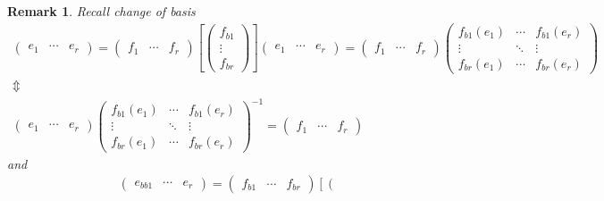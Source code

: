 \documentclass[aps,preprint]{revtex4}
\newtheorem{remark}[theorem]{Remark}
\begin{document}
\begin{remark}
Recall change of basis 
\begin{gather}
\left( 
\begin{array}{ccc}
e_{1} & \cdots & e_{r}%
\end{array}%
\right) =\left( 
\begin{array}{ccc}
f_{1} & \cdots & f_{r}%
\end{array}%
\right) \left[ \left( 
\begin{array}{c}
f_{b1} \\ 
\vdots \\ 
f_{br}%
\end{array}%
\right) \right] \left( 
\begin{array}{ccc}
e_{1} & \cdots & e_{r}%
\end{array}%
\right) =\left( 
\begin{array}{ccc}
f_{1} & \cdots & f_{r}%
\end{array}%
\right) \left( 
\begin{array}{ccc}
f_{b1}\left( e_{1}\right) & \cdots & f_{b1}\left( e_{r}\right) \\ 
\vdots & \ddots & \vdots \\ 
f_{br}\left( e_{1}\right) & \cdots & f_{br}\left( e_{r}\right)%
\end{array}%
\right) \\
\Updownarrow \\
\left( 
\begin{array}{ccc}
e_{1} & \cdots & e_{r}%
\end{array}%
\right) \left( 
\begin{array}{ccc}
f_{b1}\left( e_{1}\right) & \cdots & f_{b1}\left( e_{r}\right) \\ 
\vdots & \ddots & \vdots \\ 
f_{br}\left( e_{1}\right) & \cdots & f_{br}\left( e_{r}\right)%
\end{array}%
\right) ^{-1}=\left( 
\begin{array}{ccc}
f_{1} & \cdots & f_{r}%
\end{array}%
\right)
\end{gather}%
and 
\begin{gather}
\left( 
\begin{array}{ccc}
e_{bb1} & \cdots & e_{r}%
\end{array}%
\right) =\left( 
\begin{array}{ccc}
f_{b1} & \cdots & f_{br}%
\end{array}%
\right) \left[ \left( 
\begin{array}{c}

\end{array}
\end{gather}
\end{remark}
\end{document}
